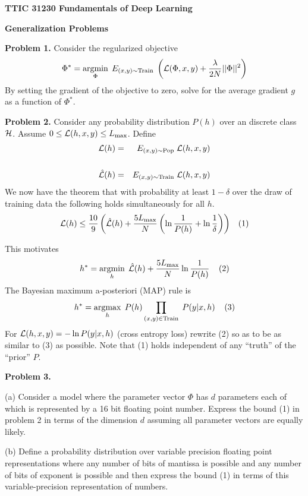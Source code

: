 \documentclass{article}
\begin{document}
\centerline{\bf TTIC 31230 Fundamentals of Deep Learning}
\bigskip
\centerline{\bf Generalization Problems}

\bigskip
\bigskip

{\bf Problem 1.} Consider the regularized objective
$$\Phi^* = \operatorname*{argmin}_\Phi \;E_{(x,y) \sim \mathrm{Train}}\;\left({\cal L}(\Phi,x,y) + \frac{\lambda}{2N}||\Phi||^2\right)$$
By setting the gradient of the objective to zero, solve for the average gradient $g$ as a function of $\Phi^*$.

\medskip
{\bf Problem 2.} Consider any probability distribution $P(h)$ over an discrete class ${\cal H}$.
Assume $0 \leq {\cal L}(h,x,y) \leq L_{\max}$. Define
\begin{eqnarray*}
{\cal L}(h)  & = &  E_{(x,y)\sim \mathrm{Pop}}\;{\cal L}(h,x,y) \\
\\
\hat{{\cal L}}(h) & = & E_{(x,y)\sim \mathrm{Train}}\;{\cal L}(h,x,y)
\end{eqnarray*}
We now have the theorem that with probability
at least $1-\delta$ over the draw of training data the following holds simultaneously for all $h$.
$${\cal L}(h) \leq \frac{10}{9}\left(\hat{\cal L}(h) + \frac{5 L_\mathrm{max}}{N}\left(\ln \frac{1}{P(h)} + \ln\frac{1}{\delta}\right)\right) \;\;\;(1)$$

This motivates
$$h^* = \operatorname*{argmin}_h \;\hat{{\cal L}}(h) + \frac{5L_{\max}}{N} \ln\frac{1}{P(h)}\;\;\;\;(2)$$
The Bayesian maximum a-posteriori (MAP) rule is
$$h^* = \operatorname*{argmax}_h\;P(h)\prod_{(x,y) \in \mathrm{Train}}\;P(y|x,h)\;\;\;\;(3)$$
For ${\cal L}(h,x,y) = - \ln P(y|x,h)$ (cross entropy loss) rewrite (2) so as to be as similar to (3) as possible.
Note that (1) holds independent of any ``truth'' of the ``prior'' $P$.

\bigskip
{\bf Problem 3.}

\medskip
(a) Consider a model where the parameter vector $\Phi$ has $d$ parameters each of which is represented by a 16 bit floating point number.
Express the bound (1) in problem 2 in terms of the dimension $d$ assuming all parameter vectors are equally likely.

\medskip
(b) Define a probability distribution over variable precision floating point representations where any number of bits of mantissa is possible and any number of bits of exponent
is possible and then express the bound (1) in terms of this variable-precision representation of numbers.
\end{document}
